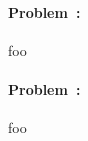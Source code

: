 \documentclass[12pt]{article}
\begin{document}
\paragraph{Problem~\theproblem:}%
foo

\paragraph{Problem~\theproblem:}%
foo
\end{document}
